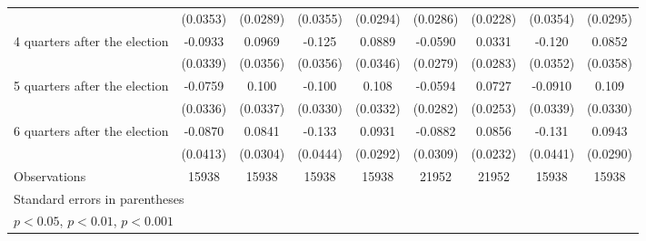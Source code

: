 \begin{table}[htbp]
\begin{tabular}{l*{8}{c}}
                    &    (0.0353)         &    (0.0289)         &    (0.0355)         &    (0.0294)         &    (0.0286)         &    (0.0228)         &    (0.0354)         &    (0.0295)         \\
[1em]
 4 quarters after the election&     -0.0933\sym{**} &      0.0969\sym{**} &      -0.125\sym{***}&      0.0889\sym{*}  &     -0.0590\sym{*}  &      0.0331         &      -0.120\sym{***}&      0.0852\sym{*}  \\
                    &    (0.0339)         &    (0.0356)         &    (0.0356)         &    (0.0346)         &    (0.0279)         &    (0.0283)         &    (0.0352)         &    (0.0358)         \\
[1em]
 5 quarters after the election&     -0.0759\sym{*}  &       0.100\sym{**} &      -0.100\sym{**} &       0.108\sym{**} &     -0.0594\sym{*}  &      0.0727\sym{**} &     -0.0910\sym{**} &       0.109\sym{***}\\
                    &    (0.0336)         &    (0.0337)         &    (0.0330)         &    (0.0332)         &    (0.0282)         &    (0.0253)         &    (0.0339)         &    (0.0330)         \\
[1em]
 6 quarters after the election&     -0.0870\sym{*}  &      0.0841\sym{**} &      -0.133\sym{**} &      0.0931\sym{**} &     -0.0882\sym{**} &      0.0856\sym{***}&      -0.131\sym{**} &      0.0943\sym{**} \\
                    &    (0.0413)         &    (0.0304)         &    (0.0444)         &    (0.0292)         &    (0.0309)         &    (0.0232)         &    (0.0441)         &    (0.0290)         \\
\hline
Observations        &       15938         &       15938         &       15938         &       15938         &       21952         &       21952         &       15938         &       15938         \\
\hline\hline
\multicolumn{9}{l}{\footnotesize Standard errors in parentheses}\\
\multicolumn{9}{l}{\footnotesize \sym{*} \(p<0.05\), \sym{**} \(p<0.01\), \sym{***} \(p<0.001\)}\\
\end{tabular}
\end{table}
